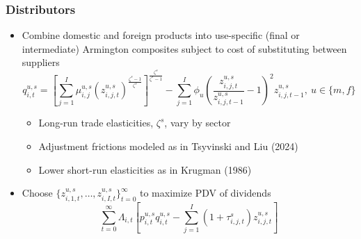 \documentclass[aspectratio=169,t,10pt,table]{beamer}
\begin{document}
\begin{frame}
  \frametitle{Distributors}
  \begin{itemize}\addtolength{\itemsep}{1ex}
  \item Combine domestic and foreign products into use-specific (final or intermediate) Armington composites subject to cost of substituting between suppliers
    \[q^{u,s}_{i,t}=\left[\sum_{j=1}^I \mu^{u,s}_{i,j}(z^{u,s}_{i,j,t})^{\frac{\zeta^{s}-1}{\zeta^{s}}}\right]^{\frac{\zeta^{s}}{\zeta^{s}-1}} - \sum_{j=1}^I\phi_u \left(\frac{z^{u,s}_{i,j,t}}{z^{u,s}_{i,j,t-1}}-1\right)^2 z^{u,s}_{i,j,t-1},\ u\in\{m,f\}\]
\vspace{-0.25cm}
    \begin{itemize}\addtolength{\itemsep}{0.5ex}
    \item Long-run trade elasticities, $\zeta^{s}$, vary by sector
    \item Adjustment frictions modeled as in Tsyvinski and Liu (2024)
    \item Lower short-run elasticities as in Krugman (1986)
    \end{itemize}
\item Choose $\{z^{u,s}_{i,1,t},\ldots,z^{u,s}_{i,I,t}\}_{t=0}^\infty$ to maximize PDV of dividends
\[\sum_{t=0}^\infty\Lambda_{i,t}\left[p^{u,s}_{i,t}q^{u,s}_{i,t}-\sum_{j=1}^I (1+\tau^s_{i,j,t}) z^{u,s}_{i,j,t}\right]\]
  \end{itemize}
\end{frame}
\end{document}
